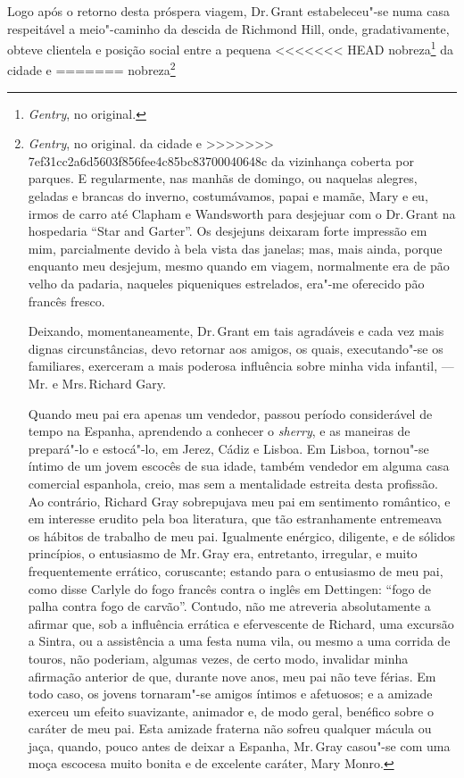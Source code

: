 {{{{{{{{{{{{{{{{{{{{{{{{{Logo após o retorno desta próspera viagem, Dr.\,Grant estabeleceu"-se numa
casa respeitável a meio"-caminho da descida de Richmond Hill, onde,
gradativamente, obteve clientela e posição social entre a pequena
<<<<<<< HEAD
nobreza\footnote{\textit{Gentry}, no original.} da cidade e
=======
nobreza\footnote{\textit{Gentry}, no original.  da cidade e
>>>>>>> 7ef31cc2a6d5603f856fee4c85bc83700040648c
da vizinhança coberta por parques. E regularmente, nas manhãs de
domingo, ou naquelas alegres, geladas e brancas do inverno,
costumávamos, papai e mamãe, Mary e eu, irmos de carro até Clapham e
Wandsworth para desjejuar com o Dr.\,Grant na hospedaria ``Star and
Garter''. Os desjejuns deixaram forte impressão em mim, parcialmente
devido à bela vista das janelas; mas, mais ainda, porque enquanto meu
desjejum, mesmo quando em viagem, normalmente era de pão velho da
padaria, naqueles piqueniques estrelados, era"-me oferecido pão francês
fresco.

Deixando, momentaneamente, Dr.\,Grant em tais agradáveis e cada vez
mais dignas circunstâncias, devo retornar aos amigos, os quais,
executando"-se os familiares, exerceram a mais poderosa influência sobre
minha vida infantil, --- Mr. e Mrs.\,Richard Gary.

Quando meu pai era apenas um vendedor, passou período considerável de
tempo na Espanha, aprendendo a conhecer o \textit{sherry}, e as maneiras
de prepará"-lo e estocá"-lo, em Jerez, Cádiz e Lisboa. Em Lisboa,
tornou"-se íntimo de um jovem escocês de sua idade, também vendedor em
alguma casa comercial espanhola, creio, mas sem a mentalidade estreita
desta profissão. Ao contrário, Richard Gray sobrepujava meu pai em
sentimento romântico, e em interesse erudito pela boa literatura, que
tão estranhamente entremeava os hábitos de trabalho de meu pai.
Igualmente enérgico, diligente, e de sólidos princípios, o entusiasmo de
Mr.\,Gray era, entretanto, irregular, e muito frequentemente errático,
coruscante; estando para o entusiasmo de meu pai, como disse Carlyle do
fogo francês contra o inglês em Dettingen: ``fogo de palha contra fogo
de carvão''. Contudo, não me atreveria absolutamente a afirmar que, sob
a influência errática e efervescente de Richard, uma excursão a Sintra,
ou a assistência a uma festa numa vila, ou mesmo a uma corrida de
touros, não poderiam, algumas vezes, de certo modo, invalidar minha
afirmação anterior de que, durante nove anos, meu pai não teve férias.
Em todo caso, os jovens tornaram"-se amigos íntimos e afetuosos; e a
amizade exerceu um efeito suavizante, animador e, de modo geral,
benéfico sobre o caráter de meu pai. Esta amizade fraterna não sofreu
qualquer mácula ou jaça, quando, pouco antes de deixar a Espanha, Mr.\,Gray casou"-se com uma moça escocesa muito bonita e de excelente caráter,
Mary Monro.

}}}}}}}}}}}}}}}}}}}}}}}}}}
